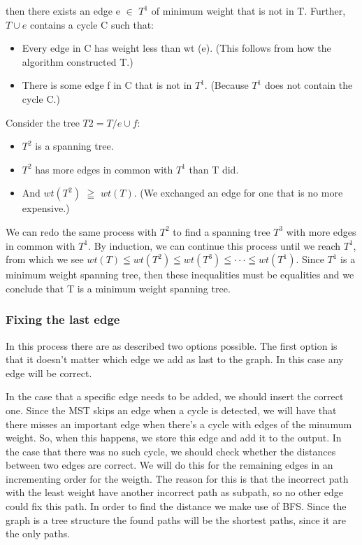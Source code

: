 \documentclass{article}
\begin{document}
then there exists an edge e $\in$ $T^1$ of minimum weight that is not in T. Further, $T \cup e$ contains a
cycle C such that:
\begin{itemize}
  \item Every edge in C has weight less than wt (e). (This follows from how the algorithm constructed
T.)
  \item There is some edge f in C that is not in $T^1$. (Because $T^1$ does not contain the cycle C.)
\end{itemize}
Consider the tree $T2 = T / {e}\cup{f}:$
\begin{itemize}
  \item $T^2$ is a spanning tree.
  \item $T^2$ has more edges in common with $T^1$ than T did.
  \item And $wt(T^2)$ $\geqq $ $wt(T)$. (We exchanged an edge for one that is no more expensive.)
\end{itemize}
We can redo the same process with $T^2$ to find a spanning tree $T^3$ with more edges in common with
$T^1$. By induction, we can continue this process until we reach $T^1$, from which we see
\newline
\newline
$wt (T) \leqq wt (T^2) \leqq wt (T^3) \leqq \cdot \cdot \cdot \leqq wt (T^1).$
\newline
\newline
Since $T^1$ is a minimum weight spanning tree, then these inequalities must be equalities and we
conclude that T is a minimum weight spanning tree.

\subsubsection{Fixing the last edge}
In this process there are as described two options possible. The first option is that it doesn't matter which edge we add as last to the graph. In this case any edge will be correct.

In the case that a specific edge needs to be added, we should insert the correct one. Since the MST skips an edge when a cycle is detected, we will have that there misses an important edge when there's a cycle with edges of the minumum weight. So, when this happens, we store this edge and add it to the output. In the case that there was no such cycle, we should check whether the distances between two edges are correct. We will do this for the remaining edges in an incrementing order for the weigth. The reason for this is that the incorrect path with the least weight have another incorrect path as subpath, so no other edge could fix this path. In order to find the distance we make use of BFS. Since the graph is a tree structure the found paths will be the shortest paths, since it are the only paths.
\end{document}
